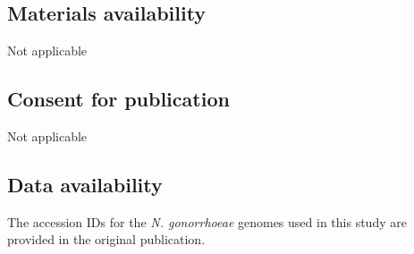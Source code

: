 \documentclass[lineno,pdflatex,sn-nature]{sn-jnl}%
\theoremstyle{thmstyleone}%
\theoremstyle{thmstyletwo}%
\theoremstyle{thmstylethree}%
\begin{document}
\subsection*{Materials availability}
Not applicable

\subsection*{Consent for publication}
Not applicable

\subsection*{Data availability}
The accession IDs for the \textit{N. gonorrhoeae} genomes used in this study are provided in the original publication. 





\end{document}
